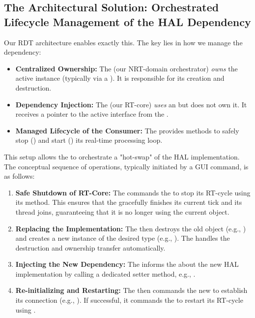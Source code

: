 \subsection{The Architectural Solution: Orchestrated Lifecycle Management of the HAL Dependency}
\label{subsec:orchestrated_lifecycle_conceptual}

Our RDT architecture enables exactly this. The key lies in how we manage the  dependency:
\begin{itemize}
    \item \textbf{Centralized Ownership:} The  (our NRT-domain orchestrator) \textit{owns} the active  instance (typically via a ). It is responsible for its creation and destruction.
    \item \textbf{Dependency Injection:} The  (our RT-core) \textit{uses} an  but does not own it. It receives a pointer to the active interface from the .
    \item \textbf{Managed Lifecycle of the Consumer:} The  provides methods to safely stop () and start () its real-time processing loop.
\end{itemize}

This setup allows the  to orchestrate a "hot-swap" of the HAL implementation. The conceptual sequence of operations, typically initiated by a GUI command, is as follows:

\begin{enumerate}
    \item \textbf{Safe Shutdown of RT-Core:} The  commands the  to stop its RT-cycle using its  method. This ensures that the  gracefully finishes its current tick and its thread joins, guaranteeing that it is no longer using the current  object.
    
    \item \textbf{Replacing the Implementation:} The  then destroys the old  object (e.g., ) and creates a new instance of the desired type (e.g., ). The  handles the destruction and ownership transfer automatically.
    
    \item \textbf{Injecting the New Dependency:} The  informs the  about the new HAL implementation by calling a dedicated setter method, e.g., .
    
    \item \textbf{Re-initializing and Restarting:} The  then commands the new  to establish its connection (e.g., ). If successful, it commands the  to restart its RT-cycle using .
\end{enumerate}

